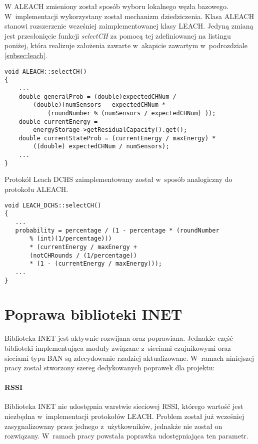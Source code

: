 W ALEACH zmieniony został sposób wyboru lokalnego węzła bazowego. W~implementacji wykorzystany został mechanizm dziedziczenia. Klasa ALEACH stanowi rozszerzenie wcześniej zaimplementowanej klasy LEACH. Jedyną zmianą jest przesłonięcie funkcji \textit{selectCH} za pomocą tej zdefiniowanej na listingu poniżej, która realizuje założenia zawarte w~akapicie  zawartym w~podrozdziale \ref{subsec:leach}.
\begin{verbatim}
void ALEACH::selectCH()
{
    ...
    double generalProb = (double)expectedCHNum / 
        (double)(numSensors - expectedCHNum * 
            (roundNumber % (numSensors / expectedCHNum) ));
    double currentEnergy = 
        energyStorage->getResidualCapacity().get();
    double currentStateProb = (currentEnergy / maxEnergy) *
        ((double) expectedCHNum / numSensors);
    ...
}
\end{verbatim}

Protokół Leach DCHS zaimplementowany został w~sposób analogiczny do protokołu ALEACH.
\begin{verbatim}
void LEACH_DCHS::selectCH()
{
   ...
   probability = percentage / (1 - percentage * (roundNumber
       % (int)(1/percentage)))
       * (currentEnergy / maxEnergy +
       (notCHRounds / (1/percentage))
       * (1 - (currentEnergy / maxEnergy)));
   ...
}
\end{verbatim}
\section{Poprawa biblioteki INET}
Biblioteka INET jest aktywnie rozwijana oraz poprawiana. Jednakże część biblioteki implementująca moduły związane z~sieciami czujnikowymi oraz sieciami typu BAN są zdecydowanie rzadziej aktualizowane. W~ramach niniejszej pracy został stworzony szereg dedykowanych poprawek dla projektu:

\paragraph{RSSI} Biblioteka INET nie udostępnia warstwie sieciowej RSSI, którego wartość jest niezbędna w~implementacji protokołów LEACH. Problem został już wcześniej zasygnalizowany przez jednego z~użytkowników, jednakże nie został on rozwiązany. W~ramach pracy powstała poprawka udostępniająca ten parametr.

